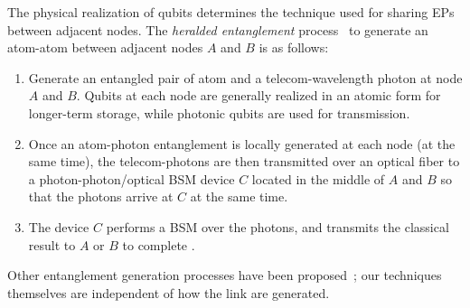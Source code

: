 The physical realization of qubits 
determines the technique used for sharing EPs between adjacent nodes. 
The \emph{heralded entanglement} process~\cite{sigcomm20, caleffi} to 
generate an atom-atom \eps between adjacent nodes $A$ and $B$
is as follows:
\begin{enumerate}
    \item 
Generate an entangled pair of atom and a telecom-wavelength photon at node $A$
and $B$.  
Qubits at each node are generally realized in an atomic form
for longer-term storage, while photonic qubits are used for transmission.

\item 
Once an atom-photon entanglement is locally generated
at each node (at the same time), 
the telecom-photons are then transmitted over an optical fiber to a photon-photon/optical BSM device $C$ located in the middle of 
$A$ and $B$ so that the photons arrive at $C$ 
at the same time.

\item 
The device $C$ performs a BSM over the photons, 
and transmits the classical result to $A$ or $B$ to complete \es.
\end{enumerate}
Other entanglement generation processes have been 
proposed~\cite{MuralidharanEtAl2016}; %
our techniques themselves are independent of how the link \eps are generated.













